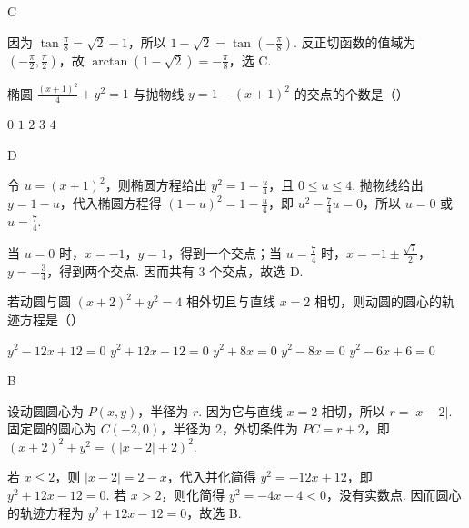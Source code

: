 \begin{answer}
C
\end{answer}

\begin{solution}
因为 \(\tan\frac{\pi}{8}=\sqrt{2}-1\)，所以 \(1-\sqrt{2}=\tan\left(-\frac{\pi}{8}\right)\). 反正切函数的值域为 \(\left(-\frac{\pi}{2},\frac{\pi}{2}\right)\)，故 \(\arctan(1-\sqrt{2})=-\frac{\pi}{8}\)，选 C.
\end{solution}

\begin{problem}

椭圆 \(\frac{(x+1)^{2}}{4} + y^{2} = 1 \) 与抛物线 \(y = 1 - (x + 1)^{2} \) 的交点的个数是（\quad）

\choicesfive
    {\(0\)}
    {\(1\)}
    {\(2\)}
    {\(3\)}
    {\(4\)}
\end{problem}

\begin{answer}
D
\end{answer}

\begin{solution}
令 \(u=(x+1)^2\)，则椭圆方程给出 \(y^2=1-\frac{u}{4}\)，且 \(0\leq u\leq4\). 抛物线给出 \(y=1-u\)，代入椭圆方程得
\(\left(1-u\right)^2=1-\frac{u}{4}\)，即 \(u^2-\frac{7}{4}u=0\)，所以 \(u=0\) 或 \(u=\frac{7}{4}\).

当 \(u=0\) 时，\(x=-1\)，\(y=1\)，得到一个交点；当 \(u=\frac{7}{4}\) 时，\(x=-1\pm\frac{\sqrt{7}}{2}\)，\(y=-\frac{3}{4}\)，得到两个交点. 因而共有 \(3\) 个交点，故选 D.
\end{solution}

\begin{problem}

若动圆与圆 \((x+2)^{2}+y^{2}=4 \) 相外切且与直线 \(x=2\) 相切，则动圆的圆心的轨迹方程是（\quad）

\choicesfive
    {\(y^{2}-12x+12=0 \)}
    {\(y^{2}+12x-12=0 \)}
    {\(y^{2}+8x=0 \)}
    {\(y^{2}-8x=0 \)}
    {\(y^{2}-6x+6=0 \)}
\end{problem}

\begin{answer}
B
\end{answer}

\begin{solution}
设动圆圆心为 \(P(x,y)\)，半径为 \(r\). 因为它与直线 \(x=2\) 相切，所以 \(r=|x-2|\). 固定圆的圆心为 \(C(-2,0)\)，半径为 \(2\)，外切条件为
\(PC=r+2\)，即
\((x+2)^2+y^2=(|x-2|+2)^2\).

若 \(x\leq2\)，则 \(|x-2|=2-x\)，代入并化简得 \(y^2=-12x+12\)，即 \(y^2+12x-12=0\). 若 \(x>2\)，则化简得 \(y^2=-4x-4<0\)，没有实数点. 因而圆心的轨迹方程为 \(y^2+12x-12=0\)，故选 B.
\end{solution}


